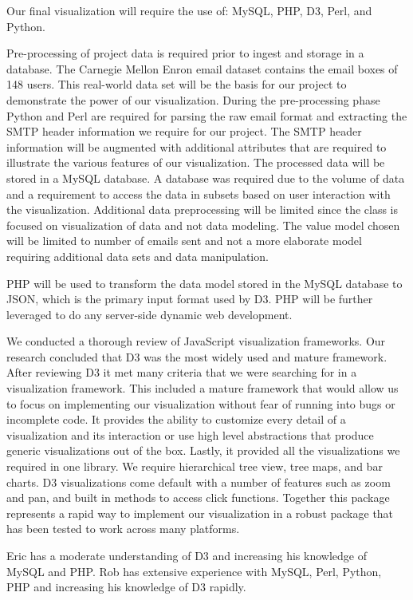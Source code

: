 \documentclass[12pt,letterpaper]{article}
\begin{document}
Our final visualization will require the use of: MySQL, PHP, D3, Perl, and Python.

Pre-processing of project data is required prior to ingest and storage in a database.  The Carnegie Mellon Enron email dataset\cite{cmuenron} contains the email boxes of 148 users.  This real-world data set will be the basis for our project to demonstrate the power of our visualization.  During the pre-processing phase Python and Perl are required for parsing the raw email format and extracting the SMTP header information we require for our project.  The SMTP header information will be augmented with additional attributes that are required to illustrate the various features of our visualization.  The processed data will be stored in a MySQL database.  A database was required due to the volume of data and a requirement to access the data in subsets based on user interaction with the visualization.  Additional data preprocessing will be limited since the class is focused on visualization of data and not data modeling.  The value model chosen will be limited to number of emails sent and not a more elaborate model requiring additional data sets and data manipulation.   

PHP will be used to transform the data model stored in the MySQL database to JSON, which is the primary input format used by D3.  PHP will be further leveraged to do any server-side dynamic web development.

We conducted a thorough review of JavaScript visualization frameworks.  Our research concluded that D3 was the most widely used and mature framework.  After reviewing D3 it met many criteria that we were searching for in a visualization framework.  This included a mature framework that would allow us to focus on implementing our visualization without fear of running into bugs or incomplete code.  It provides the ability to customize every detail of a visualization and its interaction or use high level abstractions that produce generic visualizations out of the box.  Lastly, it provided all the visualizations we required in one library.  We require hierarchical tree view, tree maps, and bar charts.  D3 visualizations come default with a number of features such as zoom and pan, and built in methods to access click functions.  Together this package represents a rapid way to implement our visualization in a robust package that has been tested to work across many platforms.

Eric has a moderate understanding of D3 and increasing his knowledge of MySQL and PHP.  Rob has extensive experience with MySQL, Perl, Python, PHP and increasing his knowledge of D3 rapidly.
\end{document}
